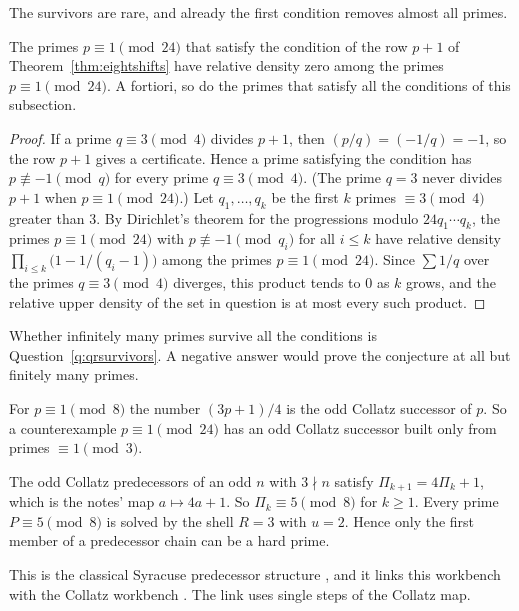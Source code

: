 The survivors are rare, and already the first condition removes almost all primes.

\begin{proposition}\label{prop:densityzero}
The primes $p\equiv1\pmod{24}$ that satisfy the condition of the row $p+1$ of Theorem~\ref{thm:eightshifts} have relative density zero among the primes $p\equiv1\pmod{24}$. A fortiori, so do the primes that satisfy all the conditions of this subsection.
\end{proposition}
\begin{proof}
If a prime $q\equiv3\pmod4$ divides $p+1$, then $(p/q)=(-1/q)=-1$, so the row $p+1$ gives a certificate. Hence a prime satisfying the condition has $p\not\equiv-1\pmod q$ for every prime $q\equiv3\pmod4$. (The prime $q=3$ never divides $p+1$ when $p\equiv1\pmod{24}$.) Let $q_1,\dots,q_k$ be the first $k$ primes $\equiv3\pmod4$ greater than $3$. By Dirichlet's theorem for the progressions modulo $24q_1\cdots q_k$, the primes $p\equiv1\pmod{24}$ with $p\not\equiv-1\pmod{q_i}$ for all $i\le k$ have relative density $\prod_{i\le k}\bigl(1-1/(q_i-1)\bigr)$ among the primes $p\equiv1\pmod{24}$. Since $\sum1/q$ over the primes $q\equiv3\pmod4$ diverges, this product tends to $0$ as $k$ grows, and the relative upper density of the set in question is at most every such product.
\end{proof}

Whether infinitely many primes survive all the conditions is Question~\ref{q:qrsurvivors}. A negative answer would prove the conjecture at all but finitely many primes.

\begin{remark}\label{rem:collatz}
For $p\equiv1\pmod8$ the number $(3p+1)/4$ is the odd Collatz successor of $p$. So a counterexample $p\equiv1\pmod{24}$ has an odd Collatz successor built only from primes $\equiv1\pmod3$.

The odd Collatz predecessors of an odd $n$ with $3\nmid n$ satisfy $\Pi_{k+1}=4\Pi_k+1$, which is the notes' map $a\mapsto4a+1$. So $\Pi_k\equiv5\pmod8$ for $k\ge1$. Every prime $P\equiv5\pmod8$ is solved by the shell $R=3$ with $u=2$. Hence only the first member of a predecessor chain can be a hard prime.

This is the classical Syracuse predecessor structure \cite{Lagarias}, and it links this workbench with the Collatz workbench \cite{WorkbenchReader}. The link uses single steps of the Collatz map.
\end{remark}

